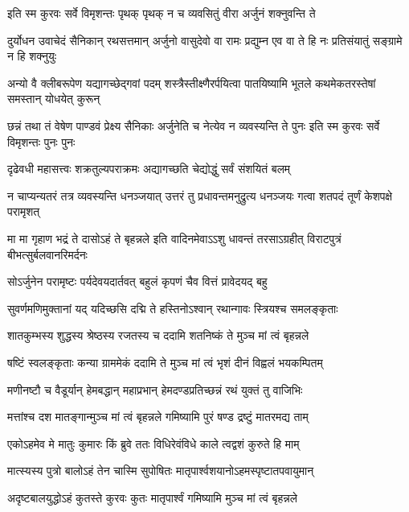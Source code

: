 \twolineshloka
{इति स्म कुरवः सर्वे विमृशन्तः पृथक् पृथक्}
{न च व्यवसितुं वीरा अर्जुनं शक्नुवन्ति ते}


\threelineshloka
{दुर्योधन उवाचेदं सैनिकान् रथसत्तमान्}
{अर्जुनो वासुदेवो वा रामः प्रद्युम्न एव वा}
{ते हि नः प्रतिसंयातुं सङ्ग्रामे न हि शक्नुयुः}


\threelineshloka
{अन्यो वै क्लीबरूपेण यद्यागच्छेद्गवां पदम्}
{शस्त्रैस्तीक्ष्णैरर्पयित्वा पातयिष्यामि भूतले}
{कथमेकतरस्तेषां समस्तान् योधयेत् कुरून्}



\threelineshloka
{छन्नं तथा तं वेषेण पाण्डवं प्रेक्ष्य सैनिकाः}
{अर्जुनेति च नेत्येव न व्यवस्यन्ति ते पुनः}
{इति स्म कुरवः सर्वे विमृशन्तः पुनः पुनः}


\twolineshloka
{दृढेवधी महासत्त्वः शक्रतुल्यपराक्रमः}
{अद्यागच्छति चेद्योद्धुं सर्वं संशयितं बलम्}


\onelineshloka
{न चाप्यन्यतरं तत्र व्यवस्यन्ति धनञ्जयात्}
\twolineshloka
{उत्तरं तु प्रधावन्तमनुद्रुत्य धनञ्जयः}
{गत्वा शतपदं तूर्णं केशपक्षे परामृशत्}


\threelineshloka
{मा मा गृहाण भद्रं ते दासोऽहं ते बृहन्नले}
{इति वादिनमेवाऽऽशु धावन्तं तरसाऽग्रहीत्}
{विराटपुत्रं बीभत्सुर्बलवानरिमर्दनः}


\twolineshloka
{सोऽर्जुनेन परामृष्टः पर्यदेवयदार्तवत्}
{बहुलं कृपणं चैव वित्तं प्रावेदयद् बहु}


\twolineshloka
{सुवर्णमणिमुक्तानां यद् यदिच्छसि दद्मि ते}
{हस्तिनोऽश्वान् रथान्गावः स्त्रियश्च समलङ्कृताः}


\twolineshloka
{शातकुम्भस्य शुद्धस्य श्रेष्ठस्य रजतस्य च}
{ददामि शतनिष्कं ते मुञ्च मां त्वं बृहन्नले}


\twolineshloka
{षष्टिं स्वलङ्कृताः कन्या ग्राममेकं ददामि ते}
{मुञ्च मां त्वं भृशं दीनं विह्वलं भयकम्पितम्}


\twolineshloka
{मणीनष्टौ च वैडूर्यान् हेमबद्धान् महाप्रभान्}
{हेमदण्डप्रतिच्छन्नं रथं युक्तं तु वाजिभिः}


\twolineshloka
{मत्तांश्च दश मातङ्गान्मुञ्च मां त्वं बृहन्नले}
{गमिष्यामि पुरं षण्ड द्रष्टुं मातरमद्य ताम्}


\twolineshloka
{एकोऽहमेव मे मातुः कुमारः किं ब्रुवे ततः}
{विधिरेवंविधे काले त्वद्वशं कुरुते हि माम्}


\twolineshloka
{मात्स्यस्य पुत्रो बालोऽहं तेन चास्मि सुपोषितः}
{मातृपार्श्वशयानोऽहमस्पृष्टातपवायुमान्}


\twolineshloka
{अदृष्टबालयुद्धोऽहं कुतस्ते कुरवः कुतः}
{मातृपार्श्वं गमिष्यामि मुञ्च मां त्वं बृहन्नले}


